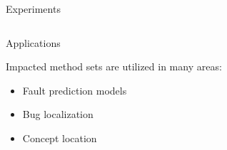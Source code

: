 \documentclass[final]{beamer}
\begin{document}
\begin{frame}{}
\begin{columns}[t]
\begin{column}{.66\linewidth}
\begin{block}{\large\sc Experiments}
\begin{minipage}[t]{0.975\linewidth}
                \end{minipage}
                \vspace*{-0.5em}
            \end{block}

            \vspace*{-1.25em}
            \begin{column}{.49\linewidth}
                \begin{block}{\large\sc Applications}
                    \vspace*{-0.25em}
                    \centering
                    \begin{minipage}[t]{0.95\linewidth}
\justifying
\large
Impacted method sets are utilized in many areas:
\begin{itemize}
\item
    Fault prediction models
\item
    Bug localization
\item
    Concept location
\end{itemize}



\end{minipage}
\end{block}
\end{column}
\end{column}
\end{columns}
\end{frame}
\end{document}
